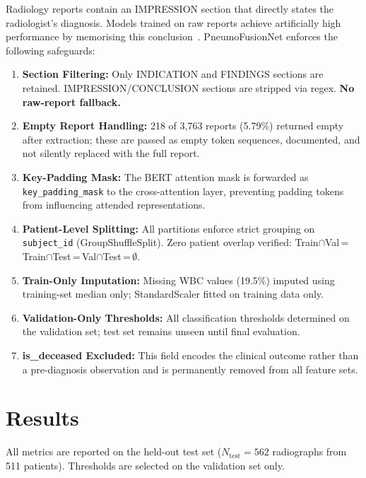 \documentclass[conference]{IEEEtran}
\begin{document}
Radiology reports contain an IMPRESSION section that directly states the radiologist's diagnosis. Models trained on raw reports achieve artificially high performance by memorising this conclusion~\cite{bannur2023knowledge}. PneumoFusionNet enforces the following safeguards:
\begin{enumerate}[noitemsep, leftmargin=*]
  \item \textbf{Section Filtering:} Only INDICATION and FINDINGS sections are retained. IMPRESSION/CONCLUSION sections are stripped via regex. \textbf{No raw-report fallback.}
  \item \textbf{Empty Report Handling:} 218 of 3,763 reports (5.79\%) returned empty after extraction; these are passed as empty token sequences, documented, and not silently replaced with the full report.
  \item \textbf{Key-Padding Mask:} The BERT attention mask is forwarded as \texttt{key\_padding\_mask} to the cross-attention layer, preventing padding tokens from influencing attended representations.
  \item \textbf{Patient-Level Splitting:} All partitions enforce strict grouping on \texttt{subject\_id} (GroupShuffleSplit). Zero patient overlap verified: Train$\cap$Val\,=\,Train$\cap$Test\,=\,Val$\cap$Test\,=\,$\emptyset$.
  \item \textbf{Train-Only Imputation:} Missing WBC values (19.5\%) imputed using training-set median only; StandardScaler fitted on training data only.
  \item \textbf{Validation-Only Thresholds:} All classification thresholds determined on the validation set; test set remains unseen until final evaluation.
  \item \textbf{is\_deceased Excluded:} This field encodes the clinical outcome rather than a pre-diagnosis observation and is permanently removed from all feature sets.
\end{enumerate}

\section{\textcolor{aideep}{Results}}

All metrics are reported on the held-out test set ($N_{\text{test}}\!=\!562$ radiographs from 511 patients). Thresholds are selected on the validation set only.
\end{document}
